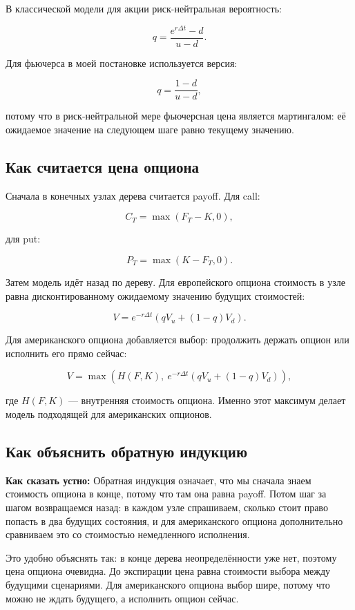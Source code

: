 \documentclass[11pt,a4paper]{article}
\newcommand{\speechbox}[1]{%
  \noindent\colorbox{softblue}{%
    \parbox{\dimexpr\linewidth-2\fboxsep\relax}{\textbf{Как сказать устно:} #1}%
  }\par\vspace{0.2em}
}
\begin{document}
В классической модели для акции риск-нейтральная вероятность:

\[
q=\frac{e^{r\Delta t}-d}{u-d}.
\]

Для фьючерса в моей постановке используется версия:

\[
q=\frac{1-d}{u-d},
\]

потому что в риск-нейтральной мере фьючерсная цена является мартингалом: её ожидаемое значение на следующем шаге равно текущему значению.

\subsection{Как считается цена опциона}

Сначала в конечных узлах дерева считается payoff. Для call:

\[
C_T=\max(F_T-K,0),
\]

для put:

\[
P_T=\max(K-F_T,0).
\]

Затем модель идёт назад по дереву. Для европейского опциона стоимость в узле равна дисконтированному ожидаемому значению будущих стоимостей:

\[
V=e^{-r\Delta t}\left(qV_u+(1-q)V_d\right).
\]

Для американского опциона добавляется выбор: продолжить держать опцион или исполнить его прямо сейчас:

\[
V=\max\left(H(F,K),\ e^{-r\Delta t}\left(qV_u+(1-q)V_d\right)\right),
\]

где $H(F,K)$ --- внутренняя стоимость опциона. Именно этот максимум делает модель подходящей для американских опционов.

\subsection{Как объяснить обратную индукцию}

\speechbox{Обратная индукция означает, что мы сначала знаем стоимость опциона в конце, потому что там она равна payoff. Потом шаг за шагом возвращаемся назад: в каждом узле спрашиваем, сколько стоит право попасть в два будущих состояния, и для американского опциона дополнительно сравниваем это со стоимостью немедленного исполнения.}

Это удобно объяснять так: в конце дерева неопределённости уже нет, поэтому цена опциона очевидна. До экспирации цена равна стоимости выбора между будущими сценариями. Для американского опциона выбор шире, потому что можно не ждать будущего, а исполнить опцион сейчас.
\end{document}
